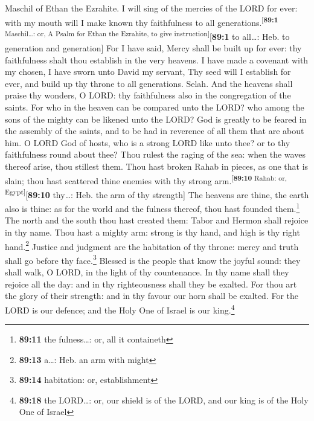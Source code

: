 Maschil of Ethan the Ezrahite.  I will sing of the mercies
of the LORD for ever: with my mouth will I make known thy faithfulness
to all generations.\textsuperscript{{[}\textbf{89:1} Maschil\ldots: or,
A Psalm for Ethan the Ezrahite, to give instruction{]}}{[}\textbf{89:1}
to all\ldots: Heb. to generation and generation{]}  For I
have said, Mercy shall be built up for ever: thy faithfulness shalt thou
establish in the very heavens.  I have made a covenant
with my chosen, I have sworn unto David my servant,  Thy
seed will I establish for ever, and build up thy throne to all
generations. Selah.  And the heavens shall praise thy
wonders, O LORD: thy faithfulness also in the congregation of the
saints.  For who in the heaven can be compared unto the
LORD? who among the sons of the mighty can be likened unto the LORD?
 God is greatly to be feared in the assembly of the
saints, and to be had in reverence of all them that are about him.
 O LORD God of hosts, who is a strong LORD like unto thee?
or to thy faithfulness round about thee?  Thou rulest the
raging of the sea: when the waves thereof arise, thou stillest them.
 Thou hast broken Rahab in pieces, as one that is slain;
thou hast scattered thine enemies with thy strong
arm.\textsuperscript{{[}\textbf{89:10} Rahab: or,
Egypt{]}}{[}\textbf{89:10} thy\ldots: Heb. the arm of thy strength{]}
 The heavens are thine, the earth also is thine: as for
the world and the fulness thereof, thou hast founded them.\footnote{\textbf{89:11}
  the fulness\ldots: or, all it containeth}  The north
and the south thou hast created them: Tabor and Hermon shall rejoice in
thy name.  Thou hast a mighty arm: strong is thy hand,
and high is thy right hand.\footnote{\textbf{89:13} a\ldots: Heb. an arm
  with might}  Justice and judgment are the habitation of
thy throne: mercy and truth shall go before thy face.\footnote{\textbf{89:14}
  habitation: or, establishment}  Blessed is the people
that know the joyful sound: they shall walk, O LORD, in the light of thy
countenance.  In thy name shall they rejoice all the day:
and in thy righteousness shall they be exalted.  For thou
art the glory of their strength: and in thy favour our horn shall be
exalted.  For the LORD is our defence; and the Holy One
of Israel is our king.\footnote{\textbf{89:18} the LORD\ldots: or, our
  shield is of the LORD, and our king is of the Holy One of Israel}
